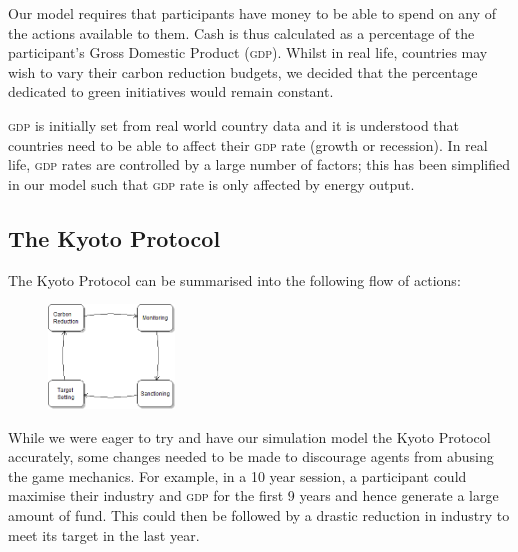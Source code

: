 %
%

Our model requires that participants have money to be able to spend on any of the actions available to them. Cash is thus calculated as a percentage of the participant's Gross Domestic Product (\textsc{gdp}). Whilst in real life, countries may wish to vary their carbon reduction budgets, we decided that the percentage dedicated to green initiatives would remain constant.

\textsc{gdp} is initially set from real world country data and it is understood that countries need to be able to affect their \textsc{gdp} rate (growth or recession). In real life, \textsc{gdp} rates are controlled by a large number of factors; this has been simplified in our model such that \textsc{gdp} rate is only affected by energy output.

\subsection{The Kyoto Protocol}
The Kyoto Protocol can be summarised into the following flow of actions:

\begin{figure}[h!]
	\centering
	\includegraphics[width=0.3\textwidth]{img/Kyoto_4_states.png}
	\label{fig:kyoto_4_states}
\end{figure}

While we were eager to try and have our simulation model the Kyoto Protocol accurately, some changes needed to be made to discourage agents from abusing the game mechanics. For example, in a 10 year session, a participant could maximise their industry and \textsc{gdp} for the first 9 years and hence generate a large amount of fund. This could then be followed by a drastic reduction in industry to meet its target in the last year.

